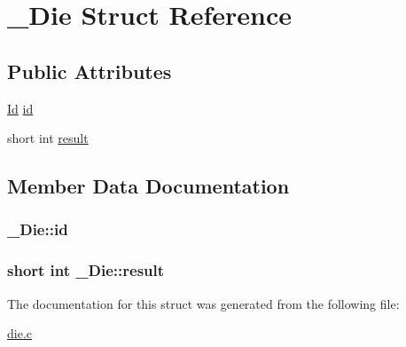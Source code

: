 \hypertarget{struct__Die}{}\section{\+\_\+\+Die Struct Reference}
\label{struct__Die}
\subsection*{Public Attributes}
\begin{DoxyCompactItemize}
\item 
\hyperlink{types_8h_a845e604fb28f7e3d97549da3448149d3}{Id} \hyperlink{struct__Die_a0887af562dda760409957f13619d36f1}{id}
\item 
short int \hyperlink{struct__Die_a93f9aa650af74c81ab2377ceb7324250}{result}
\end{DoxyCompactItemize}


\subsection{Member Data Documentation}
\subsubsection[{\texorpdfstring{id}{id}}]{ \+\_\+\+Die\+::id}\hypertarget{struct__Die_a0887af562dda760409957f13619d36f1}{}\label{struct__Die_a0887af562dda760409957f13619d36f1}
\subsubsection[{\texorpdfstring{result}{result}}]{\setlength{\rightskip}{0pt plus 5cm}short int \+\_\+\+Die\+::result}\hypertarget{struct__Die_a93f9aa650af74c81ab2377ceb7324250}{}\label{struct__Die_a93f9aa650af74c81ab2377ceb7324250}


The documentation for this struct was generated from the following file\+:\begin{DoxyCompactItemize}
\item 
\hyperlink{die_8c}{die.\+c}\end{DoxyCompactItemize}
